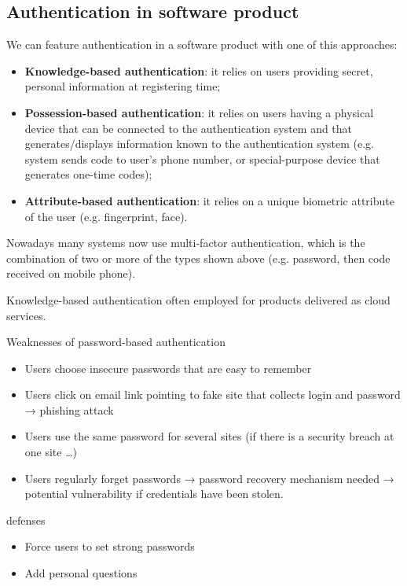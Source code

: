 \subsection{Authentication in software product}
We can feature authentication in a software product with one of this approaches:
\begin{itemize}
   \item \textbf{Knowledge-based authentication}: it relies on users providing secret, personal information at registering time;
   \item \textbf{Possession-based authentication}: it relies on users having a physical device that can be connected to the authentication system and that generates/displays information known to the authentication system (e.g. system sends code to user’s phone number, or special-purpose device that generates one-time codes);
   \item \textbf{Attribute-based authentication}: it relies on a unique biometric attribute of the user (e.g. fingerprint, face).
\end{itemize}
Nowadays many systems now use multi-factor authentication, which is the combination of two or more of the types shown above (e.g. password, then code received on mobile phone).

Knowledge-based authentication often employed for products delivered as
cloud services.


Weaknesses of password-based authentication
\begin{itemize}
   \item Users choose insecure passwords that are easy to remember
   \item Users click on email link pointing to fake site that collects login and password → phishing attack
   \item Users use the same password for several sites (if there is a security breach at one site …)
   \item Users regularly forget passwords → password recovery mechanism needed → potential vulnerability if credentials have been stolen.
\end{itemize}
defenses
\begin{itemize}
   \item Force users to set strong passwords
   \item Add personal questions
\end{itemize}

